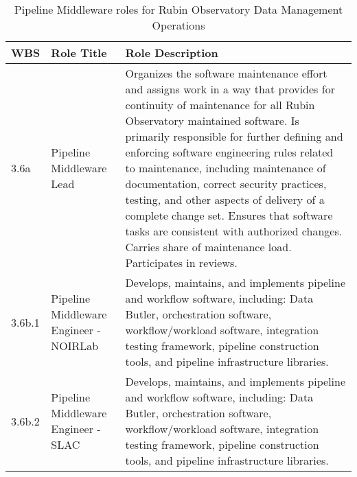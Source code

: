 \normalsize \begin{longtable} {|p{}|p{}|p{}|} \caption{Pipeline Middleware roles for Rubin Observatory Data Management Operations \label{tab:pmwroles}}\\ 
\hline 
\textbf{WBS}&\textbf{Role Title}&\textbf{Role Description} \\ \hline
{3.6a}&{Pipeline Middleware Lead}&{Organizes the software maintenance effort and assigns work in a way that provides for continuity of maintenance for all Rubin Observatory maintained software. Is primarily responsible for further defining and enforcing software engineering rules related to maintenance, including maintenance of documentation, correct security practices, testing, and other aspects of delivery of a complete change set. Ensures that software tasks are consistent with authorized changes. Carries share of maintenance load. Participates in reviews.} \\ \hline
{3.6b.1}&{Pipeline Middleware Engineer - NOIRLab}&{Develops, maintains, and implements pipeline and workflow software, including: Data Butler, orchestration software, workflow/workload software, integration testing framework, pipeline construction tools, and pipeline infrastructure libraries.} \\ \hline
{3.6b.2}&{Pipeline Middleware Engineer - SLAC}&{Develops, maintains, and implements pipeline and workflow software, including: Data Butler, orchestration software, workflow/workload software, integration testing framework, pipeline construction tools, and pipeline infrastructure libraries.} \\ \hline
\end{longtable} \normalsize
